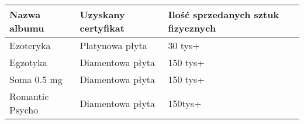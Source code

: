 \begin{tabular}{|l|l|l|}
\hline
Nazwa albumu    & Uzyskany certyfikat & Ilość sprzedanych sztuk fizycznych \\ \hline
Ezoteryka       & Platynowa płyta     & 30 tys+                            \\ \hline
Egzotyka        & Diamentowa płyta    & 150 tys+                           \\ \hline
Soma 0.5 mg     & Diamentowa płyta    & 150 tys+                           \\ \hline
Romantic Psycho & Diamentowa płyta    & 150tys+                            \\ \hline
\end{tabular}
